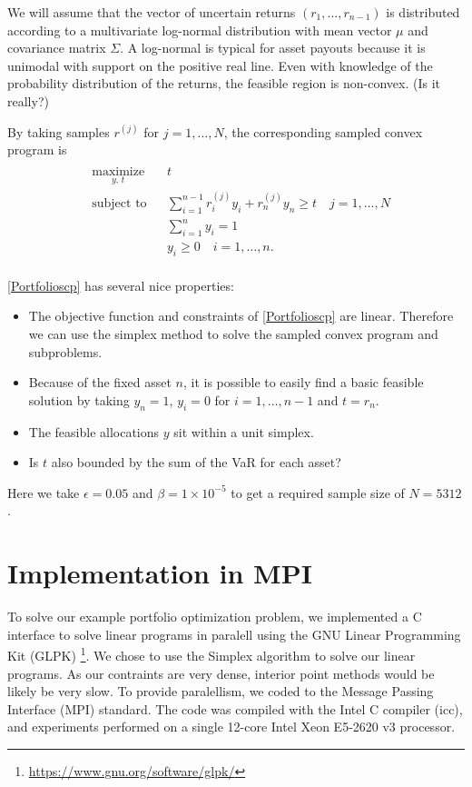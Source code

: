 \documentclass[12pt]{article}
\begin{document}
We will assume that the vector of uncertain returns $(r_1, \ldots, r_{n-1})$ is distributed according to a multivariate log-normal distribution with mean vector $\mu$ and covariance matrix $\Sigma$.
A log-normal is typical for asset payouts because it is unimodal with support on the positive real line.
Even with knowledge of the probability distribution of the returns, the feasible region is non-convex. (Is it really?)

By taking samples $r^{(j)}$ for $j = 1, \ldots, N$, the corresponding sampled convex program is 
\begin{align}\label{Portfolioscp}
\begin{split}
\begin{aligned}
    & \underset{y, \,t}{\text{maximize}}
    & & t \\
    & \text{subject to}
    & & \sum_{i=1}^{n-1} r_i^{(j)} y_i + r_n^{(j)} y_n \geq t \quad j = 1, \ldots, N \\
    & & & \sum_{i=1}^n y_i = 1 \\
    & & & y_i \geq 0 \quad i = 1, \ldots, n.
\end{aligned}
\end{split} \tag{Portfolio SCP$_N$}
\end{align}


\ref{Portfolioscp} has several nice properties:
\begin{itemize}
\item The objective function and constraints of \ref{Portfolioscp} are linear. Therefore we can use the simplex method to solve the sampled convex program and subproblems.
\item Because of the fixed asset $n$, it is possible to easily find a basic feasible solution by taking $y_n = 1$, $y_i = 0$ for $i = 1, \ldots, n-1$ and $t = r_n$.
\item The feasible allocations $y$ sit within a unit simplex.
\item Is $t$ also bounded by the sum of the VaR for each asset?
\end{itemize}

Here we take $\epsilon = 0.05$ and $\beta = 1 \times 10^{-5}$ to get a required sample size of $N = 5312$.

\section*{Implementation in MPI}

To solve our example portfolio optimization problem, we implemented a C interface to solve linear programs in paralell using the GNU Linear Programming Kit (GLPK) \footnote{\url{https://www.gnu.org/software/glpk/}}.
We chose to use the Simplex algorithm to solve our linear programs.  
As our contraints are very dense, interior point methods would be likely be very slow.
To provide paralellism, we coded to the Message Passing Interface (MPI) standard.
The code was compiled with the Intel C compiler (icc), and experiments performed on a single 12-core Intel Xeon E5-2620 v3 processor.
\end{document}
